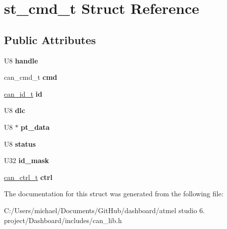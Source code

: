 \hypertarget{structst__cmd__t}{\section{st\-\_\-cmd\-\_\-t Struct Reference}
\label{structst__cmd__t}
}
\subsection*{Public Attributes}
\begin{DoxyCompactItemize}
\item 
\hypertarget{structst__cmd__t_a04aaea97ea2802a0e772e76008b739f7}{U8 {\bfseries handle}}\label{structst__cmd__t_a04aaea97ea2802a0e772e76008b739f7}

\item 
\hypertarget{structst__cmd__t_a803e12371a11db6476387a27a6711f25}{can\-\_\-cmd\-\_\-t {\bfseries cmd}}\label{structst__cmd__t_a803e12371a11db6476387a27a6711f25}

\item 
\hypertarget{structst__cmd__t_ae75c876a8dae84e253cd608eec063509}{\hyperlink{unioncan__id__t}{can\-\_\-id\-\_\-t} {\bfseries id}}\label{structst__cmd__t_ae75c876a8dae84e253cd608eec063509}

\item 
\hypertarget{structst__cmd__t_aecbba9aa509e8e2d10c8ae718de22c4f}{U8 {\bfseries dlc}}\label{structst__cmd__t_aecbba9aa509e8e2d10c8ae718de22c4f}

\item 
\hypertarget{structst__cmd__t_a01beb8792cd6ff4a72dd4b81bee2f0f2}{U8 $\ast$ {\bfseries pt\-\_\-data}}\label{structst__cmd__t_a01beb8792cd6ff4a72dd4b81bee2f0f2}

\item 
\hypertarget{structst__cmd__t_a841d8212042afee20db7068e147917a0}{U8 {\bfseries status}}\label{structst__cmd__t_a841d8212042afee20db7068e147917a0}

\item 
\hypertarget{structst__cmd__t_a3bc205477f8abaf54297904e0fc46379}{U32 {\bfseries id\-\_\-mask}}\label{structst__cmd__t_a3bc205477f8abaf54297904e0fc46379}

\item 
\hypertarget{structst__cmd__t_a3d95eb98ae7729796e358656a25605a3}{\hyperlink{structcan__ctrl__t}{can\-\_\-ctrl\-\_\-t} {\bfseries ctrl}}\label{structst__cmd__t_a3d95eb98ae7729796e358656a25605a3}

\end{DoxyCompactItemize}


The documentation for this struct was generated from the following file\-:\begin{DoxyCompactItemize}
\item 
C\-:/\-Users/michael/\-Documents/\-Git\-Hub/dashboard/atmel studio 6. project/\-Dashboard/includes/can\-\_\-lib.\-h\end{DoxyCompactItemize}
